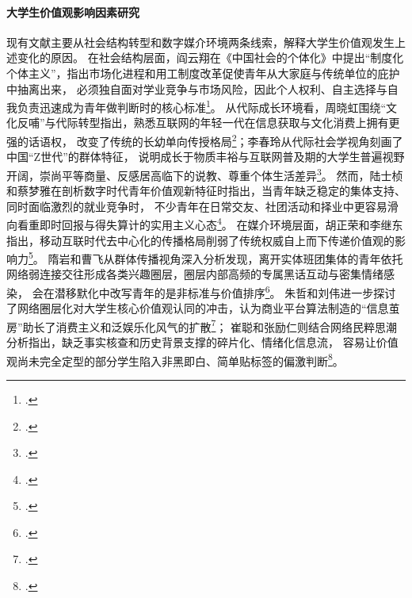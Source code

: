 \paragraph{大学生价值观影响因素研究}
现有文献主要从社会结构转型和数字媒介环境两条线索，解释大学生价值观发生上述变化的原因。
在社会结构层面，阎云翔在《中国社会的个体化》中提出“制度化个体主义”，指出市场化进程和用工制度改革促使青年从大家庭与传统单位的庇护中抽离出来，
必须独自面对学业竞争与市场风险，因此个人权利、自主选择与自我负责迅速成为青年做判断时的核心标准\footcite{Yan2012}。
从代际成长环境看，周晓虹围绕“文化反哺”与代际转型指出，熟悉互联网的年轻一代在信息获取与文化消费上拥有更强的话语权，
改变了传统的长幼单向传授格局\footcite{Zhou2020}；李春玲从代际社会学视角刻画了中国“Z世代”的群体特征，
说明成长于物质丰裕与互联网普及期的大学生普遍视野开阔，崇尚平等商量、反感居高临下的说教、尊重个体生活差异\footcite{Li2021}。
然而，陆士桢和蔡梦雅在剖析数字时代青年价值观新特征时指出，当青年缺乏稳定的集体支持、同时面临激烈的就业竞争时，
不少青年在日常交友、社团活动和择业中更容易滑向看重即时回报与得失算计的实用主义心态\footcite{Lu2022}。
在媒介环境层面，胡正荣和李继东指出，移动互联时代去中心化的传播格局削弱了传统权威自上而下传递价值观的影响力\footcite{Hu2017}。
隋岩和曹飞从群体传播视角深入分析发现，离开实体班团集体的青年依托网络弱连接交往形成各类兴趣圈层，圈层内部高频的专属黑话互动与密集情绪感染，
会在潜移默化中改写青年的是非标准与价值排序\footcite{Sui2021}。
朱哲和刘伟进一步探讨了网络圈层化对大学生核心价值观认同的冲击，认为商业平台算法制造的“信息茧房”助长了消费主义和泛娱乐化风气的扩散\footcite{Zhu2021}；
崔聪和张励仁则结合网络民粹思潮分析指出，缺乏事实核查和历史背景支撑的碎片化、情绪化信息流，
容易让价值观尚未完全定型的部分学生陷入非黑即白、简单贴标签的偏激判断\footcite{Cui2023}。


